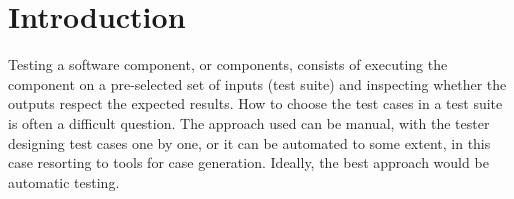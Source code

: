 
\section{Introduction}
\label{sec:intro}



Testing a software component, or components, consists of executing the component on
a pre-selected set of inputs (test suite) and inspecting whether the outputs
respect the expected results.
%
%
How to choose the test cases in a test suite is often a difficult
question.
%
The approach used
can be  manual, with the tester %
designing test cases one by %
one, or it can be automated to some extent, in this case resorting to
tools for case generation. %
%
Ideally, the best approach would be automatic testing.
%


